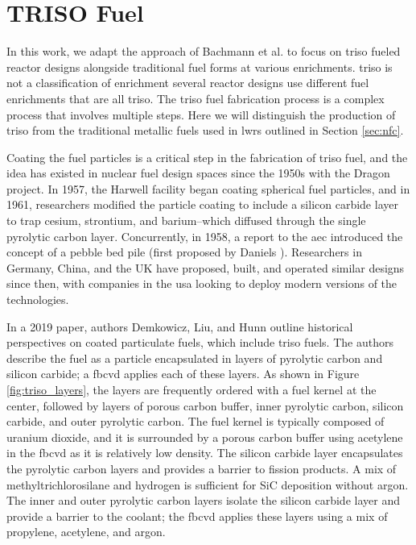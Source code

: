 \section{TRISO Fuel}
\label{sec:triso_fuel}

In this work, we adapt the approach of Bachmann et al.
\cite{bachmann_enrichment_2021} to focus on \gls{triso} fueled reactor designs
alongside traditional fuel forms at various enrichments. \gls{triso} is not a
classification of enrichment several reactor designs use different fuel
enrichments that are all \gls{triso}. The \gls{triso} fuel fabrication process
is a complex process that involves multiple steps. Here we will distinguish the
production of \gls{triso} from the traditional metallic fuels used in
\glspl{lwr} outlined in Section \ref{sec:nfc}.

Coating the fuel particles is a critical step in the fabrication of \gls{triso}
fuel, and the idea has existed in nuclear fuel design spaces since the 1950s
\cite{price_dragon_2012} with the Dragon project. In 1957, the Harwell facility
began coating spherical fuel particles, and in 1961, researchers modified the
particle coating to include a silicon carbide layer to trap cesium, strontium,
and barium--which diffused through the single pyrolytic carbon layer.
Concurrently, in 1958, a report to the \gls{aec} introduced the concept of a
pebble bed pile (first proposed by Daniels
\cite{f_b_daniels_suggestions_1944}). Researchers in Germany, China, and the UK
have proposed, built, and operated similar designs since then, with companies
in the \gls{usa} looking to deploy modern versions of the technologies.

In a 2019 paper, authors Demkowicz, Liu, and Hunn \cite{particle_review_2019}
outline historical perspectives on coated particulate fuels, which include
\gls{triso} fuels. The authors describe the fuel as a particle encapsulated in
layers of pyrolytic carbon and silicon carbide; a \gls{fbcvd} applies each of
these layers. As shown in Figure \ref{fig:triso_layers}, the layers are
frequently ordered with a fuel kernel at the center, followed by layers of
porous carbon buffer, inner pyrolytic carbon, silicon carbide, and outer
pyrolytic carbon. The fuel kernel is typically composed of uranium dioxide, and
it is surrounded by a porous carbon buffer using acetylene in the \gls{fbcvd}
as it is relatively low density. The silicon carbide layer encapsulates the
pyrolytic carbon layers and provides a barrier to fission products. A mix of
methyltrichlorosilane and hydrogen is sufficient for SiC deposition without
argon. The inner and outer pyrolytic carbon layers isolate the silicon carbide
layer and provide a barrier to the coolant; the \gls{fbcvd} applies these
layers using a mix of propylene, acetylene, and argon.

